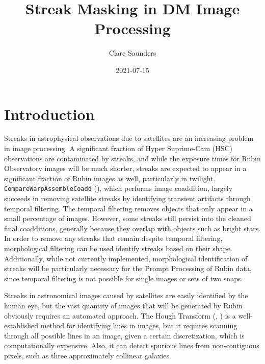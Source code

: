 \documentclass[DM,authoryear,toc]{lsstdoc}
\title{Streak Masking in DM Image Processing}
\author{%
Clare Saunders
}
\date{2021-07-15}
\begin{document}
\maketitle

\section{Introduction}
Streaks in astrophysical observations due to satellites are an increasing problem in image processing. A significant fraction of Hyper Suprime-Cam (HSC) observations are contaminated by streaks, and while the exposure times for Rubin Observatory images will be much shorter, streaks are expected to appear in a significant fraction of Rubin images as well, particularly in twilight. \texttt{CompareWarpAssembleCoadd} (\citealt{dmtn80}), which performs image coaddition, largely succeeds in removing satellite streaks by identifying transient artifacts through temporal filtering. The temporal filtering removes objects that only appear in a small percentage of images. However, some streaks still persist into the cleaned final coadditions, generally because they overlap with objects such as bright stars. In order to remove any streaks that remain despite temporal filtering, morphological filtering can be used identify streaks based on their shape. Additionally, while not currently implemented, morphological identification of streaks will be particularly necessary for the Prompt Processing of Rubin data, since temporal filtering is not possible for single images or sets of two snaps. 

Streaks in astronomical images caused by satellites are easily identified by the human eye, but the vast quantity of images that will be generated by Rubin obviously requires an automated approach. The Hough Transform (\citealt{Hough:1962}, \citealt{Douda:1972}) is a well-established method for identifying lines in images, but it requires scanning through all possible lines in an image, given a certain discretization, which is computationally expensive. Also, it can detect spurious lines from non-contiguous pixels, such as three approximately collinear galaxies.
\end{document}
